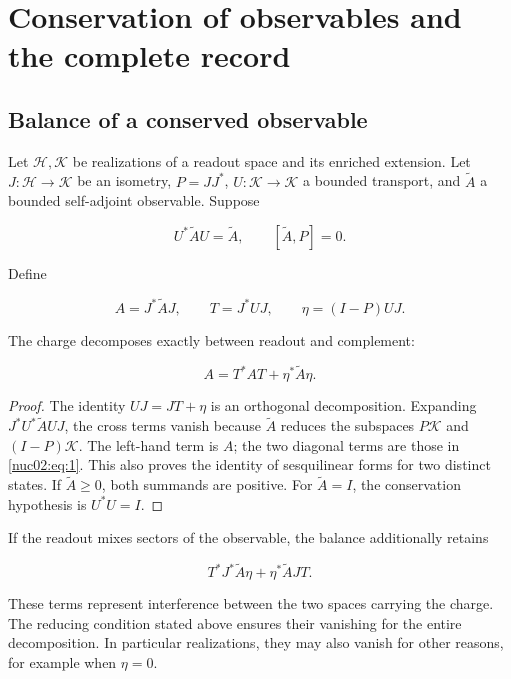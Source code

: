 \section{Conservation of observables and the complete record}
\label{nuclear:2}
\subsection{Balance of a conserved observable}

Let \(\mathcal H,\mathcal K\) be realizations of a readout space and its enriched extension. Let \(J:\mathcal H\to\mathcal K\) be an isometry, \(P=JJ^*\), \(U:\mathcal K\to\mathcal K\) a bounded transport, and \(\widetilde A\) a bounded self-adjoint observable. Suppose

\[
U^*\widetilde A U=\widetilde A,\qquad [\widetilde A,P]=0.
\]

Define

\[
A=J^*\widetilde A J,\qquad T=J^*UJ,
\qquad \eta=(I-P)UJ.
\]

\begin{proposition}
\label{nuc02:balance}
The charge decomposes exactly between readout and complement:

\begin{equation}
\boxed{A=T^*AT+\eta^*\widetilde A\eta.}\label{nuc02:eq:1}
\end{equation}
\end{proposition}

\begin{proof}
The identity \(UJ=JT+\eta\) is an orthogonal decomposition. Expanding \(J^*U^*\widetilde A UJ\), the cross terms vanish because \(\widetilde A\) reduces the subspaces \(P\mathcal K\) and \((I-P)\mathcal K\). The left-hand term is \(A\); the two diagonal terms are those in \eqref{nuc02:eq:1}. This also proves the identity of sesquilinear forms for two distinct states. If \(\widetilde A\geq0\), both summands are positive. For \(\widetilde A=I\), the conservation hypothesis is \(U^*U=I\).
\end{proof}

If the readout mixes sectors of the observable, the balance additionally retains

\[
T^*J^*\widetilde A\eta+\eta^*\widetilde A JT.
\]

These terms represent interference between the two spaces carrying the charge. The reducing condition stated above ensures their vanishing for the entire decomposition. In particular realizations, they may also vanish for other reasons, for example when \(\eta=0\).

